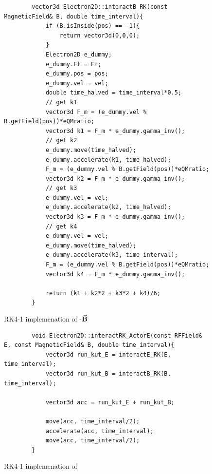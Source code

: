 \documentclass[a4paper,oneside,12pt]{report}
\numberwithin{equation}{chapter}
\begin{document}
\begin{figure}[H]
    \centering
    \captionsetup{justification=centering}
    \begin{verbatim}
        vector3d Electron2D::interactB_RK(const MagneticField& B, double time_interval){
            if (B.isInside(pos) == -1){
                return vector3d(0,0,0);
            }
            Electron2D e_dummy;
            e_dummy.Et = Et;
            e_dummy.pos = pos;
            e_dummy.vel = vel;
            double time_halved = time_interval*0.5;
            // get k1                                       
            vector3d F_m = (e_dummy.vel % B.getField(pos))*eQMratio;                                       
            vector3d k1 = F_m * e_dummy.gamma_inv();     
            // get k2
            e_dummy.move(time_halved);
            e_dummy.accelerate(k1, time_halved);                                              
            F_m = (e_dummy.vel % B.getField(pos))*eQMratio;                                               
            vector3d k2 = F_m * e_dummy.gamma_inv();    
            // get k3
            e_dummy.vel = vel;
            e_dummy.accelerate(k2, time_halved);
            vector3d k3 = F_m * e_dummy.gamma_inv();   
            // get k4
            e_dummy.vel = vel;
            e_dummy.move(time_halved);
            e_dummy.accelerate(k3, time_interval);                                           
            F_m = (e_dummy.vel % B.getField(pos))*eQMratio;  
            vector3d k4 = F_m * e_dummy.gamma_inv();
        
            return (k1 + k2*2 + k3*2 + k4)/6;
        }
    \end{verbatim}
\caption{RK4-1 implemenation of \e-$\vec{\textbf{B}}$}
\label{fig:rk1_B}
\end{figure}
\begin{figure}[H]
    \centering
    \captionsetup{justification=centering}
    \begin{verbatim}
        void Electron2D::interactRK_ActorE(const RFField& E, const MagneticField& B, double time_interval){
            vector3d run_kut_E = interactE_RK(E, time_interval);
            vector3d run_kut_B = interactB_RK(B, time_interval);
        
            vector3d acc = run_kut_E + run_kut_B;
            
            move(acc, time_interval/2);
            accelerate(acc, time_interval);
            move(acc, time_interval/2);
        }
    \end{verbatim}
\caption{RK4-1 implemenation of \eEM}
\label{fig:rk1_EM}
\end{figure}
\end{document}
